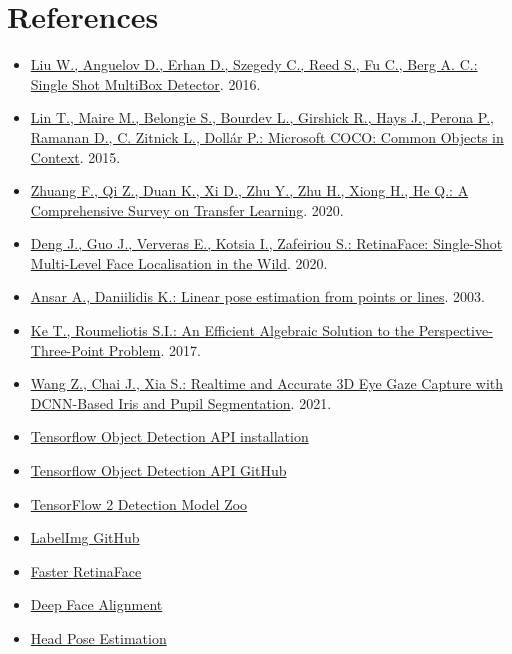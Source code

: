 \documentclass[a4paper, 12pt]{article}
\begin{document}
\section{References}
\label{References}
\begin{flushleft}
\begin{itemize}
    \item \label{Ref1} \href{https://arxiv.org/abs/1512.02325}{Liu W., Anguelov D., Erhan D., Szegedy C., Reed S., Fu C., Berg A. C.: Single Shot MultiBox Detector}. 2016.
    \item \label{Ref2} \href{https://arxiv.org/abs/1405.0312}{Lin T., Maire M., Belongie S., Bourdev L., Girshick R., Hays J., Perona P., Ramanan D., C. Zitnick L., Dollár P.: Microsoft COCO: Common Objects in Context}. 2015.
    \item \label{Ref3} \href{https://arxiv.org/abs/1911.02685}{Zhuang F., Qi Z., Duan K., Xi D., Zhu Y., Zhu H., Xiong H., He Q.: A Comprehensive Survey on Transfer Learning}. 2020.
    \item \label{Ref4} \href{https://openaccess.thecvf.com/content_CVPR_2020/html/Deng_RetinaFace_Single-Shot_Multi-Level_Face_Localisation_in_the_Wild_CVPR_2020_paper.html}{ Deng J., Guo J., Ververas E., Kotsia I., Zafeiriou S.: RetinaFace: Single-Shot Multi-Level Face Localisation in the Wild}. 2020.
    \item \label{Ref5} \href{https://ieeexplore.ieee.org/document/1195992}{Ansar A., Daniilidis K.: Linear pose estimation from points or lines}. 2003.
    \item \label{Ref6} \href{https://openaccess.thecvf.com/content_cvpr_2017/html/Ke_An_Efficient_Algebraic_CVPR_2017_paper.html}{ Ke T., Roumeliotis S.I.: An Efficient Algebraic Solution to the Perspective-Three-Point Problem}. 2017.
    \item \label{Ref7} \href{https://ieeexplore.ieee.org/document/8818661}{Wang Z., Chai J., Xia S.: Realtime and Accurate 3D Eye Gaze Capture with DCNN-Based Iris and Pupil Segmentation}. 2021.
    \item \label{Ref8} \href{https://tensorflow-object-detection-api-tutorial.readthedocs.io/en/latest/}{Tensorflow Object Detection API installation}
    \item \label{Ref9} \href{https://github.com/tensorflow/models/tree/master/research/object_detection}{Tensorflow Object Detection API GitHub}
    \item \label{Ref10} \href{https://github.com/tensorflow/models/blob/master/research/object_detection/g3doc/tf2_detection_zoo.md}{TensorFlow 2 Detection Model Zoo}
    \item \label{Ref11} \href{https://github.com/tzutalin/labelImg}{LabelImg GitHub}
    \item \label{Ref12} \href{https://github.com/1996scarlet/faster-mobile-retinaface}{Faster RetinaFace}
    \item \label{Ref13} \href{https://github.com/deepinx/deep-face-alignment}{Deep Face Alignment}
    \item \label{Ref14} \href{https://github.com/lincolnhard/head-pose-estimation}{Head Pose Estimation}
\end{itemize}
\end{flushleft}
\end{document}
